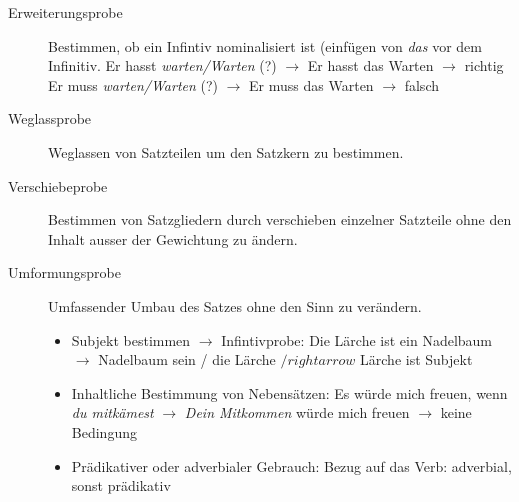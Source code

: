 \begin{description}
	\item [Erweiterungsprobe] Bestimmen, ob ein Infintiv nominalisiert ist (einfügen von \textit{das} vor dem Infinitiv.
	Er hasst \textit{warten/Warten} (?) $\rightarrow$ Er hasst das Warten $\rightarrow$ richtig\\
	Er muss \textit{warten/Warten} (?) $\rightarrow$ Er muss das Warten $\rightarrow$ falsch\\

	\item [Weglassprobe] Weglassen von Satzteilen um den Satzkern zu bestimmen.

	\item [Verschiebeprobe] Bestimmen von Satzgliedern durch verschieben einzelner Satzteile ohne 
	den Inhalt ausser der Gewichtung zu ändern.

	\item [Umformungsprobe] Umfassender Umbau des Satzes ohne den Sinn zu verändern.
	\begin{itemize}\itemsep0em
		\item Subjekt bestimmen $\rightarrow$ Infintivprobe: Die Lärche ist ein Nadelbaum $\rightarrow$ Nadelbaum sein / die Lärche $/rightarrow$ Lärche ist Subjekt
		\item Inhaltliche Bestimmung von Nebensätzen: Es würde mich freuen, wenn \textit{du mitkämest} $\rightarrow$ \textit{Dein Mitkommen} würde mich freuen
		$\rightarrow$ keine Bedingung
		\item Prädikativer oder adverbialer Gebrauch: Bezug auf das Verb: adverbial, sonst prädikativ 
	\end{itemize}

\end{description}

